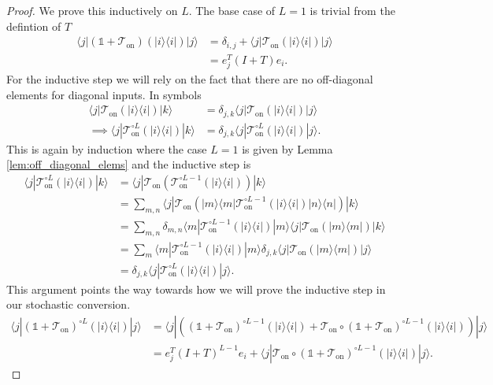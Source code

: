 \documentclass{article}
\newcommand{\on}{\text{on}}
\newcommand{\ket}[1]{|#1\rangle}
\newcommand{\bra}[1]{\langle #1|}
\newcommand{\ketbra}[2]{| #1\rangle\! \langle #2|}
\newcommand{\identity}{\mathds{1}}
\begin{document}
\begin{proof}
    We prove this inductively on $L$. The base case of $L = 1$ is trivial from the defintion of $T$
    \begin{align}
    \bra{j} (\identity + \mathcal{T}_{\on})(\ketbra{i}{i}) \ket{j} &= \delta_{i,j} + \bra{j} \mathcal{T}_{\on}(\ketbra{i}{i}) \ket{j} \\
    &= e_j^T (I +  T) e_i.
\end{align}
For the inductive step we will rely on the fact that there are no off-diagonal elements for diagonal inputs. In symbols
\begin{align}
    \bra{j} \mathcal{T}_{\on} (\ketbra{i}{i}) \ket{k} &= \delta_{j,k} \bra{j} \mathcal{T}_{\on} (\ketbra{i}{i}) \ket{j} \\
    \implies \bra{j} \mathcal{T}_{\on}^{\circ L} (\ketbra{i}{i}) \ket{k} &= \delta_{j,k} \bra{j} \mathcal{T}_{\on}^{\circ L} (\ketbra{i}{i}) \ket{j}.
\end{align}
This is again by induction where the case $L = 1$ is given by Lemma \ref{lem:off_diagonal_elems} and the inductive step is 
\begin{align}
    \bra{j} \mathcal{T}_{\on}^{\circ L} (\ketbra{i}{i}) \ket{k} &= \bra{j} \mathcal{T}_{\on} \left( \mathcal{T}_{\on}^{\circ L - 1} (\ketbra{i}{i}) \right) \ket{k} \\
    &= \sum_{m, n} \bra{j} \mathcal{T}_{\on}\left( \ketbra{m}{m}\mathcal{T}_{\on}^{\circ L - 1}(\ketbra{i}{i}) \ketbra{n}{n}\right) \ket{k} \\
    &= \sum_{m, n} \delta_{m,n} \bra{m}\mathcal{T}_{\on}^{\circ L - 1}(\ketbra{i}{i}) \ket{m} \bra{j} \mathcal{T}_{\on}\left(   \ketbra{m}{m} \right) \ket{k} \\
    &= \sum_{m} \bra{m}\mathcal{T}_{\on}^{\circ L - 1}(\ketbra{i}{i}) \ket{m} \delta_{j,k} \bra{j} \mathcal{T}_{\on}\left(   \ketbra{m}{m} \right) \ket{j} \\
    &= \delta_{j,k} \bra{j} \mathcal{T}_{\on}^{\circ L} (\ketbra{i}{i}) \ket{j}.
\end{align} 
This argument points the way towards how we will prove the inductive step in our stochastic conversion. 
\begin{align}
    \bra{j} (\identity + \mathcal{T}_{\on})^{\circ L}(\ketbra{i}{i}) \ket{j} &= \bra{j} \left( (\identity + \mathcal{T}_{\on})^{\circ L - 1} (\ketbra{i}{i}) + \mathcal{T}_{\on} \circ (\identity + \mathcal{T}_{\on})^{\circ L - 1} (\ketbra{i}{i}) \right)\ket{j} \\
    &= e_j^T (I + T)^{L - 1} e_i + \bra{j} \mathcal{T}_{\on} \circ (\identity + \mathcal{T}_{\on})^{\circ L - 1} (\ketbra{i}{i}) \ket{j} . \label{eq:matrix_reloaded1}

\end{align}
\end{proof}
\end{document}
